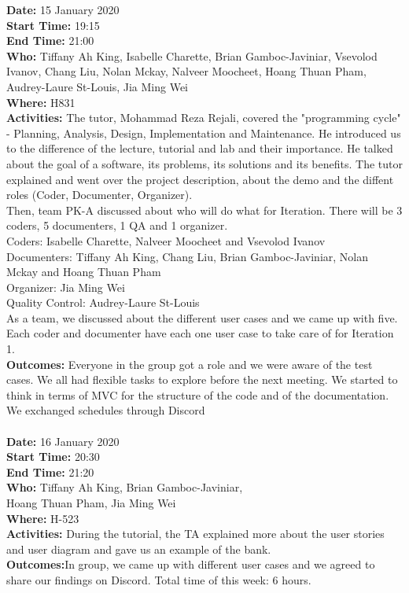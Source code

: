 \documentclass[12pt]{article}
\begin{document}
{\bf Date:} 15 January 2020\\
{\bf Start Time:} 19:15 \\
{\bf End Time:} 21:00 \\
{\bf Who:}  Tiffany Ah King, Isabelle Charette, Brian Gamboc-Javiniar, Vsevolod Ivanov,
Chang Liu, Nolan Mckay, Nalveer Moocheet, Hoang Thuan Pham, Audrey-Laure St-Louis, Jia Ming Wei \\
{\bf Where:} H831 \\
{\bf Activities:} The tutor, Mohammad Reza Rejali, covered the "programming cycle" - Planning, Analysis, Design, Implementation and Maintenance. He introduced us to the difference of the lecture, tutorial and lab and their importance. He talked about the goal of a software, its problems, its solutions and its benefits. The tutor explained and went over the project description, about the demo and the diffent roles (Coder, Documenter, Organizer).\\

Then, team PK-A discussed about who will do what for Iteration. There will be 3  coders, 5 documenters, 1 QA and 1 organizer. \\

Coders: Isabelle Charette, Nalveer Moocheet and Vsevolod Ivanov\\

Documenters: Tiffany Ah King, Chang Liu, Brian Gamboc-Javiniar, Nolan Mckay and  Hoang Thuan Pham\\

Organizer: Jia Ming Wei\\

Quality Control: Audrey-Laure St-Louis\\

As a team, we discussed about the different user cases and we came up with five. Each coder and documenter have each one user case to take care of for Iteration 1. 
\\

{\bf Outcomes:} Everyone in the group got a role and we were aware of the test cases. We all had flexible tasks to explore before the next meeting. We started to think in terms of MVC for the structure of the code and of the documentation. We exchanged schedules through Discord\\\\

{\bf Date:} 16 January 2020\\
{\bf Start Time:} 20:30\\
{\bf End Time:} 21:20\\
{\bf Who:} Tiffany Ah King, Brian Gamboc-Javiniar,\\
 Hoang Thuan Pham, Jia Ming Wei\\
{\bf Where:} H-523\\
{\bf Activities:} During the tutorial, the TA explained more about the user stories and user diagram and gave us an example of the bank.\\
{\bf Outcomes:}In group, we came up with different user cases and we agreed to share our findings on Discord. Total time of this week: 6 hours.\\ \\
\end{document}
